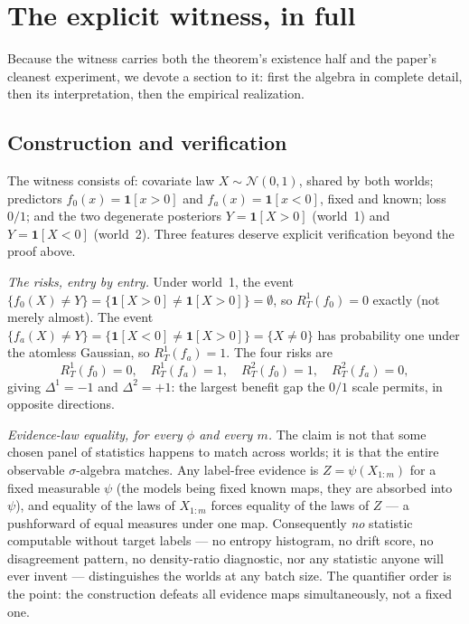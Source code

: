 \section{The explicit witness, in full}\label{sec:t1-witness}

Because the witness carries both the theorem's existence half and the
paper's cleanest experiment, we devote a section to it: first the algebra
in complete detail, then its interpretation, then the empirical
realization.

\subsection{Construction and verification}\label{sec:t1-witness-algebra}

The witness consists of: covariate law $X\sim\mathcal N(0,1)$, shared by
both worlds; predictors $f_0(x)=\mathbf1[x>0]$ and $f_a(x)=\mathbf1[x<0]$,
fixed and known; loss $0/1$; and the two degenerate posteriors
$Y=\mathbf1[X>0]$ (world~1) and $Y=\mathbf1[X<0]$ (world~2). Three features
deserve explicit verification beyond the proof above.

\emph{The risks, entry by entry.} Under world~1, the event
$\{f_0(X)\neq Y\}=\{\mathbf1[X>0]\neq\mathbf1[X>0]\}=\emptyset$, so
$R_T^1(f_0)=0$ exactly (not merely almost). The event
$\{f_a(X)\neq Y\}=\{\mathbf1[X<0]\neq\mathbf1[X>0]\}=\{X\neq0\}$ has
probability one under the atomless Gaussian, so $R_T^1(f_a)=1$. The four
risks are
\[
R_T^1(f_0)=0,\quad R_T^1(f_a)=1,\quad R_T^2(f_0)=1,\quad R_T^2(f_a)=0,
\]
giving $\Delta^1=-1$ and $\Delta^2=+1$: the largest benefit gap the $0/1$
scale permits, in opposite directions.

\emph{Evidence-law equality, for every $\phi$ and every $m$.} The claim is
not that some chosen panel of statistics happens to match across worlds; it
is that the entire observable $\sigma$-algebra matches. Any label-free
evidence is $Z=\psi(X_{1:m})$ for a fixed measurable $\psi$ (the models
being fixed known maps, they are absorbed into $\psi$), and equality of the
laws of $X_{1:m}$ forces equality of the laws of $Z$ --- a pushforward of
equal measures under one map. Consequently \emph{no} statistic computable
without target labels --- no entropy histogram, no drift score, no
disagreement pattern, no density-ratio diagnostic, nor any statistic anyone
will ever invent --- distinguishes the worlds at any batch size. The
quantifier order is the point: the construction defeats all evidence maps
simultaneously, not a fixed one.


